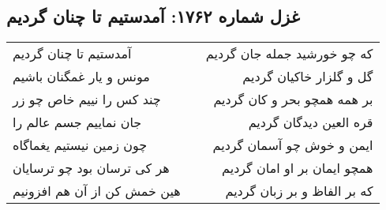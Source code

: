 \begin{center}
\section*{غزل شماره ۱۷۶۲: آمدستیم تا چنان گردیم}
\label{sec:1762}
\begin{longtable}{l p{0.5cm} r}
آمدستیم تا چنان گردیم
&&
که چو خورشید جمله جان گردیم
\\
مونس و یار غمگنان باشیم
&&
گل و گلزار خاکیان گردیم
\\
چند کس را نییم خاص چو زر
&&
بر همه همچو بحر و کان گردیم
\\
جان نماییم جسم عالم را
&&
قره العین دیدگان گردیم
\\
چون زمین نیستیم یغماگاه
&&
ایمن و خوش چو آسمان گردیم
\\
هر کی ترسان بود چو ترسایان
&&
همچو ایمان بر او امان گردیم
\\
هین خمش کن از آن هم افزونیم
&&
که بر الفاظ و بر زبان گردیم
\\
\end{longtable}
\end{center}
